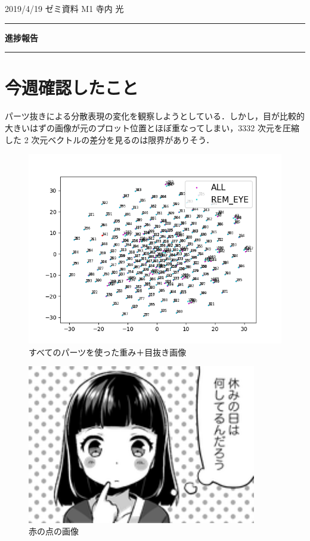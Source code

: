 \documentclass[onecolumn]{ujarticle}     %
\begin{document}
	
% 

\noindent

\hspace{1em}
2019/4/19
ゼミ資料
\hfill
M1 寺内 光

\vspace{2mm}

\hrule

\begin{center}
{\Large \bf 進捗報告}
\end{center}


\hrule
\vspace{3mm}

\section{今週確認したこと}
	パーツ抜きによる分散表現の変化を観察しようとしている．しかし，目が比較的大きいはずの画像が元のプロット位置とほぼ重なってしまい，3332 次元を圧縮した 2 次元ベクトルの差分を見るのは限界がありそう．
	
	\begin{figure}[h]
		\centering
		\includegraphics[width=180mm]{t_sne_CAE_hwf_80_weight_all.png}
		\caption{すべてのパーツを使った重み＋目抜き画像}
	\end{figure}
	
	\begin{figure}[h]
		\hspace{30mm}
		\centering
		\includegraphics[width=100mm]{1-2.png}
		\caption{赤の点の画像}
	\end{figure}
	
\end{document}
